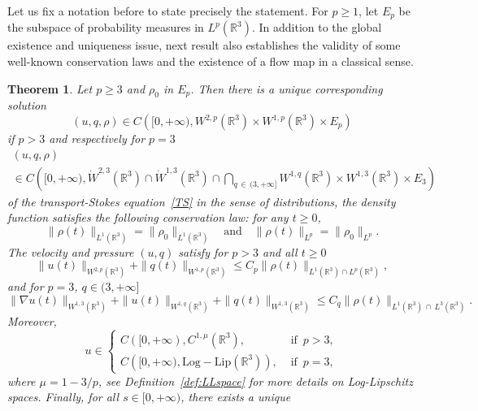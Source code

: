 \documentclass[10pt]{amsart}
\newtheorem{theo}{Theorem}[section]
\theoremstyle{definition}\newtheorem{defi}[theo]{Definition}\newtheorem{rema}[theo]{Remark}\newtheorem{exam}[theo]{Example}\newtheorem{exem}[theo]{Example}\newtheorem{nota}[theo]{Notation}
\newcommand{\LLip}{\mathrm{Log-Lip}}
\newcommand{\R}{\mathbb{R}}
\renewcommand{\leq}{\leqslant}
\renewcommand{\geq}{\geqslant}
\begin{document}
Let us fix a notation before to state precisely the statement. For $p\geq 1$, let $E_p$ be the subspace of probability measures in $ L^p (\R^3) $. In addition to the global existence and uniqueness issue, next result also establishes the validity of some well-known conservation laws and the existence of a flow map in a classical sense.
\begin{theo} \label{thm0}
Let $p\geq 3$ and $\rho_0$ in $E_p$. Then there is a unique corresponding solution
\[
(u,q,\rho) \in C\left([0,+\infty),W^{2,p} \left(\R^3\right) \times W^{1,p} \left(\R^3\right)\times E_p\right)
\]
if $p>3$ and respectively for $p=3$
\begin{multline*}
(u,q,\rho) \\
\in C\left([0,+\infty),\dot{W}^{2,3} \left(\R^3\right) 
\cap \dot{W}^{1,3} \left(\R^3\right)\cap \underset{q\,\in\,(3,+\infty]}{\bigcap} W^{1,q}\left(\R^3\right) \times W^{1,3} \left(\R^3\right)\times E_3\right)
\end{multline*}
of the transport-Stokes equation~\eqref{TS} in the sense of distributions, the density function satisfies the following conservation law: for any $t\geq 0$,
\begin{equation}\label{conserLp}
\|\rho(t)\|_{ L^1 \left(\R^3\right) } =\|\rho_0\|_{ L^1 \left(\R^3\right) } \quad \text{and} \quad \|\rho(t)\|_{L^p} =\|\rho_0\|_{L^p}.
\end{equation}
The velocity and pressure $(u,q)$ satisfy for $p>3$ and all $t\geq 0$
\begin{equation}\label{reg_u,p}
\|u(t)\|_{W^{2,p}\left(\R^3\right)}+ \|q(t)\|_{W^{1,p}\left(\R^3\right)} \leq C_p \| \rho(t) \|_{L^1\left(\R^3\right)\cap L^p\left(\R^3\right)},
\end{equation}
and for $p=3$, $q\in(3,+\infty]$
\begin{equation}\label{reg_u,p_bis}
\|\nabla u(t)\|_{W^{1,3}\left(\R^3\right)}+\|u(t)\|_{W^{1,q}\left(\R^3\right)}+ \|q(t)\|_{W^{1,3}\left(\R^3\right)} \leq C_q \| \rho(t) \|_{L^1\left(\R^3\right)\,\cap\,L^3\left(\R^3\right)}.
\end{equation}
Moreover,
\begin{equation}\label{ulipoullip}
u \in
\begin{cases}
C([0,+\infty), C^{1,\mu} \left(\R^3\right), & \text{ if } \, p > 3,
\\ C\left([0,+\infty), \LLip \left(\R^3\right)\right), & \text{ if } \, p = 3,
\end{cases}
\end{equation}
where $\mu=1-3/p$, see Definition~\ref{def:LLspace} for more details on Log-Lipschitz spaces. Finally, for all $s\in[0,+\infty)$, there exists a unique

\end{theo}
\end{document}
